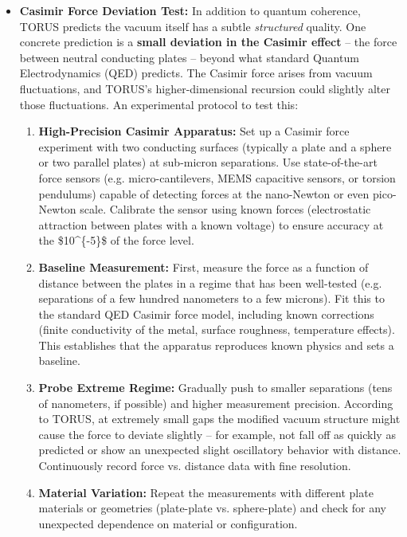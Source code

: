 \documentclass[]{article}
\begin{document}
\begin{itemize}
\item
  \textbf{Casimir Force Deviation Test:} In addition to quantum
  coherence, TORUS predicts the vacuum itself has a subtle
  \emph{structured} quality. One concrete prediction is a \textbf{small
  deviation in the Casimir effect} -- the force between neutral
  conducting plates -- beyond what standard Quantum Electrodynamics
  (QED) predicts. The Casimir force arises from vacuum fluctuations, and
  TORUS's higher-dimensional recursion could slightly alter those
  fluctuations. An experimental protocol to test this:

  \begin{enumerate}
  \def\labelenumi{\alph{enumi}.}
  \item
    \textbf{High-Precision Casimir Apparatus:} Set up a Casimir force
    experiment with two conducting surfaces (typically a plate and a
    sphere or two parallel plates) at sub-micron separations. Use
    state-of-the-art force sensors (e.g. micro-cantilevers, MEMS
    capacitive sensors, or torsion pendulums) capable of detecting
    forces at the nano-Newton or even pico-Newton scale. Calibrate the
    sensor using known forces (electrostatic attraction between plates
    with a known voltage) to ensure accuracy at the \$10\^{}\{-5\}\$ of
    the force level.
  \item
    \textbf{Baseline Measurement:} First, measure the force as a
    function of distance between the plates in a regime that has been
    well-tested (e.g. separations of a few hundred nanometers to a few
    microns). Fit this to the standard QED Casimir force model,
    including known corrections (finite conductivity of the metal,
    surface roughness, temperature effects). This establishes that the
    apparatus reproduces known physics and sets a baseline.
  \item
    \textbf{Probe Extreme Regime:} Gradually push to smaller separations
    (tens of nanometers, if possible) and higher measurement precision.
    According to TORUS, at extremely small gaps the modified vacuum
    structure might cause the force to deviate slightly -- for example,
    not fall off as quickly as predicted or show an unexpected slight
    oscillatory behavior with distance​. Continuously record force vs.
    distance data with fine resolution.
  \item
    \textbf{Material Variation:} Repeat the measurements with different
    plate materials or geometries (plate-plate vs. sphere-plate) and
    check for any unexpected dependence on material or configuration.

\end{enumerate}
\end{itemize}
\end{document}
